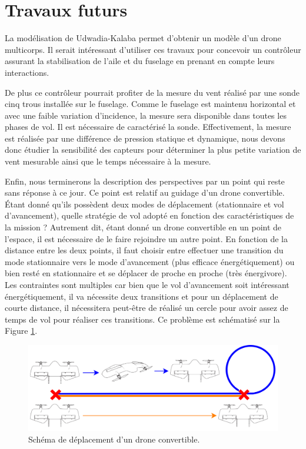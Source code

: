 \section*{Travaux futurs}
{
    \color{green}
La modélisation de Udwadia-Kalaba permet d'obtenir un modèle d'un drone multicorps. Il serait intéressant d'utiliser ces travaux pour concevoir un contrôleur assurant la stabilisation de l'aile et du fuselage en prenant en compte leurs interactions.

De plus ce contrôleur pourrait profiter de la mesure du vent réalisé par une sonde cinq trous installée sur le fuselage. Comme le fuselage est maintenu horizontal et avec une faible variation d'incidence, la mesure sera disponible dans toutes les phases de vol. Il est nécessaire de caractérisé la sonde. Effectivement, la mesure est réalisée par une différence de pression statique et dynamique, nous devons donc étudier la sensibilité des capteurs pour déterminer la plus petite variation de vent mesurable ainsi que le temps nécessaire à la mesure.

Enfin, nous terminerons la description des perspectives par un point qui reste sans réponse à ce jour. Ce point est relatif au guidage d'un drone convertible. Étant donné qu'ils possèdent deux modes de déplacement (stationnaire et vol d'avancement), quelle stratégie de vol adopté en fonction des caractéristiques de la mission ?
Autrement dit, étant donné un drone convertible en un point de l'espace, il est nécessaire de le faire rejoindre un autre point. En fonction de la distance entre les deux points, il faut choisir entre effectuer une transition du mode stationnaire vers le mode d'avancement (plus efficace énergétiquement) ou bien resté en stationnaire et se déplacer de proche en proche (très énergivore). Les contraintes sont multiples car bien que le vol d'avancement soit intéressant énergétiquement, il va nécessite deux transitions et pour un déplacement de courte distance, il nécessitera peut-être de réalisé un cercle pour avoir assez de temps de vol pour réaliser ces transitions. Ce problème est schématisé sur la Figure \ref{fig:pbhybride}.

\begin{figure}[ht!]
    \centerline{
    \includegraphics[trim=0cm 0cm 0cm 0cm,clip,width=0.8\columnwidth]{figures/DroneConvertibleGuidage.png}}
    \caption{Schéma de déplacement d'un drone convertible.}
    \label{fig:pbhybride}
\end{figure}


}
